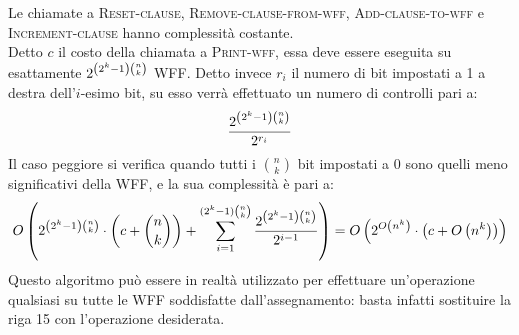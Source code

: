 Le chiamate a \textsc{Reset-clause}, \textsc{Remove-clause-from-wff}, \textsc{Add-clause-to-wff} e \textsc{Increment-clause} hanno complessità costante.\\
Detto $c$ il costo della chiamata
a \textsc{Print-wff}, essa deve essere eseguita su esattamente $2^{\left(2^k - 1\right)\binom{n}{k}}$ WFF. Detto invece $r_i$ il numero di bit impostati a 1 a destra dell'$i$-esimo bit, su esso verrà effettuato un numero di controlli pari a:
\begin{equation*}
    \frac{2^{\left(2^k - 1\right) \binom{n}{k}}}{2^{r_i}}
\end{equation*}
Il caso peggiore si verifica quando tutti i $\binom{n}{k}$ bit impostati a 0 sono quelli meno significativi della WFF, e la sua complessità è pari a:
\begin{equation*}
    O \left(2^{\left(2^k - 1\right)\binom{n}{k}} \cdot \left(c + \binom{n}{k}\right) 
    + \sum_{i=1}^{(2^k - 1)\binom{n}{k}} \frac{2^{\left(2^k - 1\right)\binom{n}{k}}}{2^{i-1}}\right) 
    = O\left(2^{O\left(n^k\right)} \cdot \left(c + O\left(n^k\right)\right)\right)
\end{equation*}
Questo algoritmo può essere in realtà utilizzato per effettuare un'operazione
qualsiasi su tutte le WFF soddisfatte dall'assegnamento: basta infatti sostituire
la riga 15 con l'operazione desiderata.

